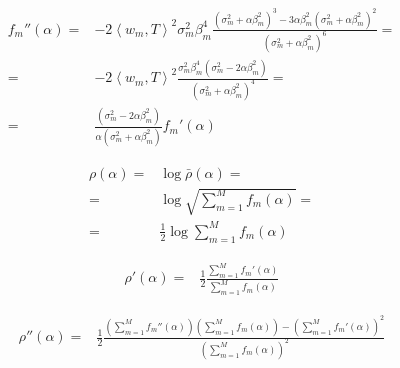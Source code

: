 \documentclass[a4paper,10pt]{article}
\theoremstyle{plain}
\theoremstyle{definition}
\theoremstyle{remark}
\newcommand{\pa}[1]{\left(#1\right)}
\newcommand{\ang}[1]{\left<#1\right>}
\newcommand{\bra}[1]{\left[#1\right]}
\begin{document}
\begin{align*}
  f_m '' (\alpha) = & -2 \ang{w_m, T} ^2 \sigma _m ^2 \beta _m ^4
  \frac{\pa { \sigma _m ^2 + \alpha \beta _m ^2 } ^3 - 3\alpha \beta
    _m ^2\pa { \sigma _m ^2 + \alpha \beta _m ^2 } ^2 }{\pa { \sigma
      _m ^2 + \alpha \beta _m ^2 } ^6} = \\
  = & -2 \ang{w_m, T} ^2 \frac{ \sigma _m ^2 \beta _m ^4 \pa { \sigma
      _m ^2 -2 \alpha \beta _m ^2 } }{\pa { \sigma _m ^2 + \alpha
      \beta _m ^2 } ^ 4} = \\
  = & \frac{\pa { \sigma _m ^2 -2 \alpha \beta _m ^2 }}{\alpha
    \pa{\sigma _m ^2 + \alpha \beta _m ^2}} f_m ' (\alpha)
\end{align*}

\begin{align*}
  \rho (\alpha) = & \log \bar \rho (\alpha) =\\
  = & \log \sqrt { \sum _{m=1} ^M f_m (\alpha) } = \\
  = & \frac{1}{2} \log \sum _{m=1} ^M f_m ( \alpha)
\end{align*}

\begin{align*}
  \rho ' (\alpha) = & \frac{1}{2} \frac{\sum _{m=1} ^M f_m
    '(\alpha)}{\sum _{m=1} ^M f_m ( \alpha)}
\end{align*}

\begin{align*}
  \rho '' (\alpha) = & \frac{1}{2} \frac{ \pa{\sum _{m=1} ^M f_m ''
      (\alpha)}\pa{ \sum _{m=1} ^M f_m ( \alpha) } - \pa{ \sum _{m=1} ^M
      f_m ' ( \alpha) } ^2 }{\pa{\sum _{m=1} ^M f_m (\alpha)} ^2}
\end{align*}


\end{document}
